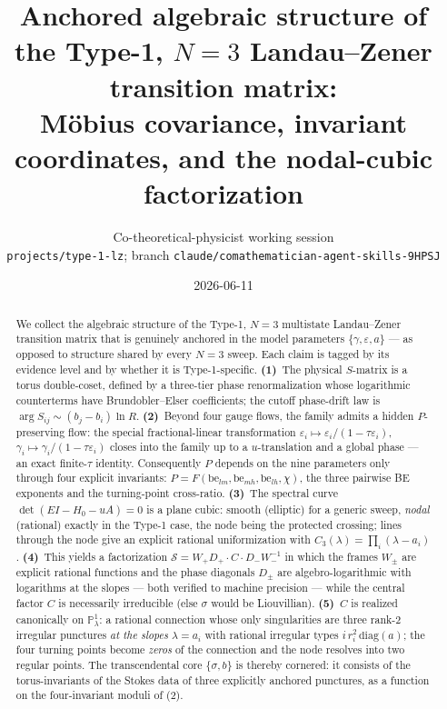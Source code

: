 \documentclass[11pt]{article}
\title{\vspace{-2em}\textbf{Anchored algebraic structure of the Type-1, $N{=}3$
Landau--Zener transition matrix:\\ \large M\"obius covariance, invariant coordinates,
and the nodal-cubic factorization}}
\author{Co-theoretical-physicist working session\\[2pt]
\small\texttt{projects/type-1-lz}; branch \texttt{claude/comathematician-agent-skills-9HPSJ}}
\date{2026-06-11}
\theoremstyle{definition}
\theoremstyle{remark}
\newcommand{\eps}{\varepsilon}
\newcommand{\PP}{\mathbb{P}^1}
\newcommand{\diag}{\mathrm{diag}}
\newcommand{\Scat}{\mathcal{S}}
\newcommand{\be}{\mathrm{be}}
\begin{document}
\maketitle
\vspace{-1.5em}

\begin{abstract}
We collect the algebraic structure of the Type-1, $N{=}3$ multistate Landau--Zener
transition matrix that is genuinely anchored in the model parameters
$\{\gamma,\eps,a\}$ --- as opposed to structure shared by every $N{=}3$ sweep. Each claim
is tagged by its evidence level and by whether it is Type-1-specific.
\textbf{(1)}~The physical $S$-matrix is a torus double-coset, defined by a three-tier
phase renormalization whose logarithmic counterterms have Brundobler--Elser coefficients;
the cutoff phase-drift law is $\arg S_{ij}\sim(b_j-b_i)\ln R$.
\textbf{(2)}~Beyond four gauge flows, the family admits a hidden $P$-preserving flow:
the special fractional-linear transformation $\eps_i\mapsto\eps_i/(1-\tau\eps_i)$,
$\gamma_i\mapsto\gamma_i/(1-\tau\eps_i)$ closes into the family up to a $u$-translation
and a global phase --- an exact finite-$\tau$ identity. Consequently $P$ depends on the
nine parameters only through four explicit invariants:
$P=F(\be_{lm},\be_{mh},\be_{lh},\chi)$, the three pairwise BE exponents and the
turning-point cross-ratio.
\textbf{(3)}~The spectral curve $\det(EI-H_0-uA)=0$ is a plane cubic: smooth (elliptic)
for a generic sweep, \emph{nodal} (rational) exactly in the Type-1 case, the node being
the protected crossing; lines through the node give an explicit rational uniformization
with $C_3(\lambda)=\prod_i(\lambda-a_i)$.
\textbf{(4)}~This yields a factorization $\Scat=W_+D_+\cdot C\cdot D_-W_-^{-1}$ in which
the frames $W_\pm$ are explicit rational functions and the phase diagonals $D_\pm$ are
algebro-logarithmic with logarithms at the slopes --- both verified to machine
precision --- while the central factor $C$ is necessarily irreducible (else $\sigma$
would be Liouvillian).
\textbf{(5)}~$C$ is realized canonically on $\PP_\lambda$: a rational connection whose
only singularities are three rank-$2$ irregular punctures \emph{at the slopes}
$\lambda=a_i$ with rational irregular types $i\,r_i^2\,\diag(a)$; the four turning
points become \emph{zeros} of the connection and the node resolves into two regular
points. The transcendental core $\{\sigma,b\}$ is thereby cornered: it consists of the
torus-invariants of the Stokes data of three explicitly anchored punctures, as a function
on the four-invariant moduli of (2).
\end{abstract}
\end{document}
